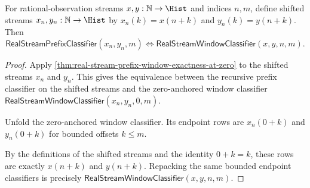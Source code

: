 \begin{theorem}
\label{thm:real-stream-shifted-prefix-window-exactness}
For rational-observation streams $x,y:\mathbb{N}\to\Hist$ and indices $n,m$,
define shifted streams $x_n,y_n:\mathbb{N}\to\Hist$ by
$x_n(k)=x(n+k)$ and $y_n(k)=y(n+k)$. Then
$$
\mathsf{RealStreamPrefixClassifier}(x_n,y_n,m)
\Longleftrightarrow
\mathsf{RealStreamWindowClassifier}(x,y,n,m).
$$
\end{theorem}
\begin{proof}
Apply \autoref{thm:real-stream-prefix-window-exactness-at-zero} to the shifted
streams $x_n$ and $y_n$. This gives the equivalence between the recursive
prefix classifier on the shifted streams and the zero-anchored window
classifier $\mathsf{RealStreamWindowClassifier}(x_n,y_n,0,m)$.

Unfold the zero-anchored window classifier. Its endpoint rows are
$x_n(0+k)$ and $y_n(0+k)$ for bounded offsets $k\le m$.

By the definitions of the shifted streams and the identity $0+k=k$, these rows
are exactly $x(n+k)$ and $y(n+k)$. Repacking the same bounded endpoint
classifiers is precisely $\mathsf{RealStreamWindowClassifier}(x,y,n,m)$.
\end{proof}

